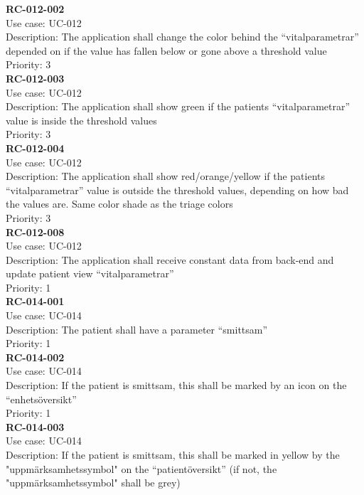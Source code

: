 \textbf{RC-012-002} \\
Use case: UC-012 \\
Description: The application shall change the color behind the “vitalparametrar” depended on if the value has fallen below or gone above a threshold value  \\
Priority: 3 \\
\newline
\textbf{RC-012-003} \\
Use case: UC-012 \\
Description: The application shall show green if the patients “vitalparametrar” value is inside the threshold values \\
Priority: 3 \\
\newline
\textbf{RC-012-004} \\
Use case: UC-012 \\
Description: The application shall show red/orange/yellow if the patients “vitalparametrar” value is outside the threshold values, depending on how bad the values are. Same color shade as the triage colors \\
Priority: 3 \\
\newline
\textbf{RC-012-008} \\
Use case: UC-012 \\
Description: The application shall receive constant data from back-end and update patient view “vitalparametrar”  \\
Priority: 1 \\
\newline
\textbf{RC-014-001} \\
Use case: UC-014 \\
Description: The patient shall have a parameter “smittsam” \\
Priority: 1 \\
\newline
\textbf{RC-014-002} \\
Use case: UC-014 \\
Description: If the patient is smittsam, this shall be marked by an icon on the “enhetsöversikt” \\
Priority: 1 \\
\newline
\textbf{RC-014-003} \\
Use case: UC-014 \\
Description: If the patient is smittsam, this shall be marked in yellow by the "uppmärksamhetssymbol" on the “patientöversikt” (if not, the "uppmärksamhetssymbol" shall be grey) \\
